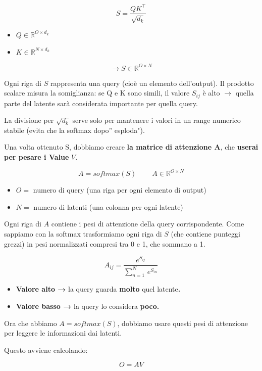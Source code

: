 \documentclass[
  11pt,
]{article}
\begin{document}
\[S = \frac{QK^{\top}}{\sqrt{d_{k}}}\]

\begin{itemize}
\item
  \(Q \in \mathbb{R}^{O \times d_{k}}\)
\item
  \(K \in \mathbb{R}^{N \times d_{k}}\)
\end{itemize}

\[\rightarrow S \in \mathbb{R}^{O \times N}\]

Ogni riga di \(S\) rappresenta una query (cioè un elemento
dell'output). Il prodotto scalare misura la somiglianza:
se Q e K sono simili, il valore \(S_{ij}\) è alto \(\rightarrow\) quella
parte del latente sarà considerata importante per quella query.

La divisione per \(\sqrt{d_{k}}\) serve solo per mantenere i valori in
un range numerico stabile (evita che la softmax dopo'' esploda").

Una volta ottenuto S, dobbiamo creare \textbf{la matrice di attenzione
A}, che \textbf{userai per pesare i Value} \(V\).

\[A = softmax(S)\ \ \ \ \ \ \ \ \ \ A \in \mathbb{R}^{O \times N}\]

\begin{itemize}
\item
  \(O =\) numero di query (una riga per ogni elemento di output)
\item
  \(N =\) numero di latenti (una colonna per ogni latente)
\end{itemize}

Ogni riga di \(A\) contiene i pesi di attenzione della query
corrispondente. Come sappiamo con la softmax trasformiamo ogni riga di
\(S\) (che contiene punteggi grezzi) in pesi normalizzati compresi tra 0
e 1, che sommano a 1.

\[A_{ij} = \frac{e^{S_{ij}}}{\sum_{n = 1}^{N}\, e^{S_{in}}}\]

\begin{itemize}
\item
  \textbf{Valore alto →} la query guarda \textbf{molto} quel
  latente\textbf{.}
\item
  \textbf{Valore basso →} la query lo considera \textbf{poco.}
\end{itemize}

Ora che abbiamo \(A = softmax(S)\), dobbiamo usare questi pesi di
attenzione per leggere le informazioni dai latenti.

Questo avviene calcolando:

\[O = AV\]
\end{document}
